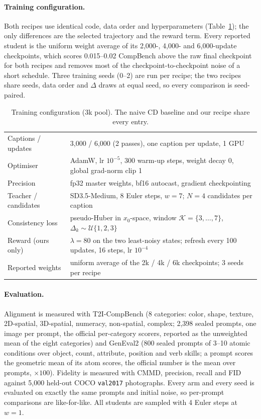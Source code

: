 \documentclass{article} %
\newcommand{\naive}{naive CD}
\begin{document}
\paragraph{Training configuration.} Both recipes use identical code, data order and hyperparameters
(Table~\ref{tab:hyper}); the only differences are the selected trajectory and the reward term. Every
reported student is the uniform weight average of its 2,000-, 4,000- and 6,000-update checkpoints, which
scores 0.015--0.02 CompBench above the raw final checkpoint for both recipes and removes most of the
checkpoint-to-checkpoint noise of a short schedule. Three training seeds
(0--2) are run per recipe; the two recipes share seeds, data order and $\Delta$ draws at equal seed, so
every comparison is seed-paired.

\begin{table}[t]
\centering
\caption{Training configuration (3k pool). The \naive{} baseline and our recipe share every entry.}
\label{tab:hyper}
\small
\begin{tabular}{l l}
\toprule
Captions / updates & 3,000 / 6,000 (2 passes), one caption per update, 1 GPU \\
Optimiser & AdamW, lr $10^{-5}$, 300 warm-up steps, weight decay 0, global grad-norm clip 1 \\
Precision & fp32 master weights, bf16 autocast, gradient checkpointing \\
Teacher / candidates & SD3.5-Medium, 8 Euler steps, $w{=}7$; $N{=}4$ candidates per caption \\
Consistency loss & pseudo-Huber in $x_0$-space, window $\mathcal K=\{3,\dots,7\}$, $\Delta_k\sim\mathcal U\{1,2,3\}$ \\
Reward (ours only) & $\lambda{=}80$ on the two least-noisy states; refresh every 100 updates, 16 steps, lr $10^{-4}$ \\
Reported weights & uniform average of the 2k / 4k / 6k checkpoints; 3 seeds per recipe \\
\bottomrule
\end{tabular}
\end{table}

\paragraph{Evaluation.} Alignment is measured with T2I-CompBench (8 categories: color, shape, texture,
2D-spatial, 3D-spatial, numeracy, non-spatial, complex; 2,398 sealed prompts, one image per prompt, the
official per-category scorers, reported as the unweighted mean of the eight categories) and GenEval2
(800 sealed prompts of 3--10 atomic conditions over object, count, attribute, position and verb skills; a
prompt scores the geometric mean of its atom scores, the official number is the mean over prompts,
$\times100$). Fidelity is measured with CMMD, precision, recall and FID against 5,000 held-out COCO
\texttt{val2017} photographs. Every arm and every seed is evaluated on exactly the same prompts and
initial noise, so per-prompt comparisons are like-for-like. All students are sampled with 4 Euler steps
at $w{=}1$.
\end{document}
